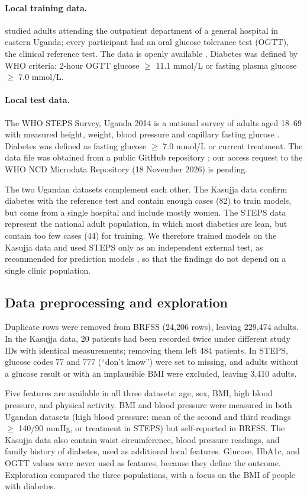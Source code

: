\documentclass[11pt]{article}
\begin{document}
\paragraph{Local training data.} \citet{kasujja2022} studied adults attending the outpatient department of a general hospital in eastern Uganda; every participant had an oral glucose tolerance test (OGTT), the clinical reference test. The data is openly available \citep{kasujja2022data}. Diabetes was defined by WHO criteria: 2-hour OGTT glucose $\geq$ 11.1 mmol/L or fasting plasma glucose $\geq$ 7.0 mmol/L.

\paragraph{Local test data.} The WHO STEPS Survey, Uganda 2014 is a national survey of adults aged 18--69 with measured height, weight, blood pressure and capillary fasting glucose \citep{riley2016steps, moh2014steps}. Diabetes was defined as fasting glucose $\geq$ 7.0 mmol/L or current treatment. The data file was obtained from a public GitHub repository \citep{andanter_repo}; our access request to the WHO NCD Microdata Repository (18 November 2026) is pending.

 The two Ugandan datasets complement each other. The Kasujja data confirm diabetes with the reference test and contain enough cases (82) to train models, but come from a single hospital and include mostly women. The STEPS data represent the national adult population, in which most diabetics are lean, but contain too few cases (44) for training. We therefore trained models on the Kasujja data and used STEPS only as an independent external test, as recommended for prediction models \citep{collins2015tripod}, so that the findings do not depend on a single clinic population.

\subsection{Data preprocessing and exploration}

Duplicate rows were removed from BRFSS (24,206 rows), leaving 229,474 adults. In the Kasujja data, 20 patients had been recorded twice under different study IDs with identical measurements; removing them left 484 patients. In STEPS, glucose codes 77 and 777 (``don't know'') were set to missing, and adults without a glucose result or with an implausible BMI were excluded, leaving 3,410 adults.

Five features are available in all three datasets: age, sex, BMI, high blood pressure, and physical activity. BMI and blood pressure were measured in both Ugandan datasets (high blood pressure: mean of the second and third readings $\geq$ 140/90 mmHg, or treatment in STEPS) but self-reported in BRFSS. The Kasujja data also contain waist circumference, blood pressure readings, and family history of diabetes, used as additional local features. Glucose, HbA1c, and OGTT values were never used as features, because they define the outcome. Exploration compared the three populations, with a focus on the BMI of people with diabetes.
\end{document}
